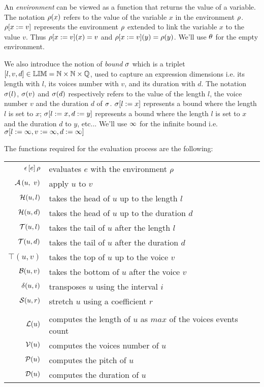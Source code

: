 \documentclass[10pt,a4paper,frenchb]{article}
\begin{document}
An \emph{environment} can be viewed as a function that returns the value of a variable. The notation $\rho(x)$ refers to the value of the variable $x$ in the environment $\rho$. $\rho[x := v]$ represents the environment $\rho$ extended to link the variable $x$ to the value $v$. Thus $\rho[x := v](x) = v$ and $\rho[x := v](y) = \rho(y)$. We'll use $\theta $ for the empty environment.


We also introduce the notion of \emph{bound} $\sigma$ which is a triplet $[l, v, d] \in \mathbb{LIM} = \mathbb{N} \times \mathbb{N} \times \mathbb{Q}$, used to capture an expression dimensions i.e. its length with $l$, its voices number with $v$, and its duration with $d$. 
The notation $\sigma(l)$, $\sigma(v)$ and $\sigma(d)$ respectively refers to the value of the length $l$, the voice number $v$ and the duration $d$  of $\sigma$. $\sigma[l := x]$ represents a bound where the length $l$ is set to $x$; $\sigma[l := x, d:=y]$ represents a bound where the length $l$ is set to $x$ and the duration $d$ to $y$, etc... We'll use $\infty$ for the infinite bound i.e. $\sigma[l := \infty, v:= \infty, d:= \infty]$



The functions required for the evaluation process are the following:
\begin{center}
\begin{tabular}{rl}
 \hline
 $\epsilon\left[e\right]\rho$ 			& evaluates $e$ with the environment $\rho$ \\
 $\mathcal A\left(u,\ v\right)$ 		& apply $u$ to $v$ \\
 $\mathcal H(u,l)$ 				& takes the head of $u$ up to the length $l$ \\
 $\mathcal H(u,d)$ 				& takes the head of $u$ up to the duration $d$ \\
 $\mathcal T(u,l)$ 				& takes the tail of $u$ after the length $l$ \\
 $\mathcal T(u,d)$ 				& takes the tail of $u$ after the duration $d$ \\
 $\top(u,v)$ 				& takes the top of $u$ up to the voice $v$ \\
 $\mathcal B(u,v)$ 				& takes the bottom of $u$ after the voice $v$ \\
 $\delta(u,i)$ 		   		& transposes $u$ using the interval $i$ \\
 $\mathcal S(u,r)$ 			& stretch $u$ using a coefficient $r$ \\
\multicolumn{2}{c}{\dotfill{}} \\
 $\mathcal L(u)$ 				& computes the length of $u$ as $max$ of the voices events count \\
 $\mathcal V(u)$ 				& computes the voices number of $u$ \\
 $\mathcal P(u)$ 				& computes the pitch of $u$ \\
 $\mathcal D(u)$ 					& computes the duration of $u$ \\
 \hline
\end{tabular}
\end{center}
\end{document}
